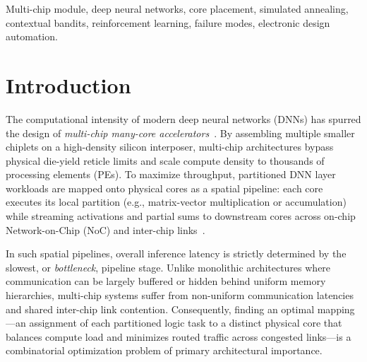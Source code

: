 \documentclass[10pt,conference]{IEEEtran}
\begin{document}
\begin{IEEEkeywords}
Multi-chip module, deep neural networks, core placement, simulated annealing, contextual bandits, reinforcement learning, failure modes, electronic design automation.
\end{IEEEkeywords}

\section{Introduction}
\label{sec:intro}

The computational intensity of modern deep neural networks (DNNs) has spurred the design of \emph{multi-chip many-core accelerators}~\cite{wu2020todaes,shao2019simba}. By assembling multiple smaller chiplets on a high-density silicon interposer, multi-chip architectures bypass physical die-yield reticle limits and scale compute density to thousands of processing elements (PEs). To maximize throughput, partitioned DNN layer workloads are mapped onto physical cores as a spatial pipeline: each core executes its local partition (e.g., matrix-vector multiplication or accumulation) while streaming activations and partial sums to downstream cores across on-chip Network-on-Chip (NoC) and inter-chip links~\cite{shao2019simba,chen2016eyeriss}.

In such spatial pipelines, overall inference latency is strictly determined by the slowest, or \emph{bottleneck}, pipeline stage. Unlike monolithic architectures where communication can be largely buffered or hidden behind uniform memory hierarchies, multi-chip systems suffer from non-uniform communication latencies and shared inter-chip link contention. Consequently, finding an optimal mapping—an assignment of each partitioned logic task to a distinct physical core that balances compute load and minimizes routed traffic across congested links—is a combinatorial optimization problem of primary architectural importance.
\end{document}
